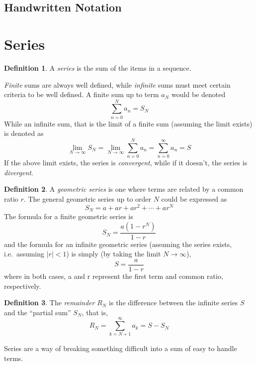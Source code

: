 \documentclass[10pt]{scrartcl}
\numberwithin{equation}{subsection}
\theoremstyle{definition}
\newtheorem{definition}{Definition}[section]
\theoremstyle{remark}
\newenvironment{definitionSR}
	{
		\begin{siderules}
			\begin{definition}
			}
			{
			\end{definition}
		\end{siderules}
	}
\begin{document}
\begin{itemize}
\end{itemize}
\subsection{Handwritten Notation}

\section{Series}
\begin{definitionSR}
	A \textit{series} is the sum of the items in a sequence.
\end{definitionSR}


\emph{Finite} sums are always well defined, while \emph{infinite} sums must meet certain criteria to be well defined. A finite sum up to term $a_N$ would be denoted
\[
	\sum_{n=0}^N a_n = S_N
\]
While an infinite sum, that is the limit of a finite sum (assuming the limit exists) is denoted as
\[
	\lim_{N \to \infty} S_N = \lim_{N \to \infty} \sum_{n=0}^N a_n = \sum_{n=0}^\infty a_n = S
\]
If the above limit exists, the series is \textit{convergent}, while if it doesn't, the series is \textit{divergent}.

\begin{definitionSR}
	A \textit{geometric series} is one where terms are related by a common ratio $r$. The general geometric series up to order $N$ could be expressed as
	\[
		S_N = a + ar + ar^2 + \cdots + ar^N
	\]
	The formula for a finite geometric series is
	\begin{equation}
		S_N = \frac{a(1-r^N)}{1-r}
	\end{equation}
	and the formula for an infinite geometric series (assuming the series exists, i.e.\ assuming $|r|<1$) is simply (by taking the limit $N \to \infty$),
	\begin{equation}
		S = \frac{a}{1-r}
	\end{equation}
	where in both cases, a and r represent the first term and common ratio, respectively.\\
\end{definitionSR}


\begin{definitionSR}
	The \textit{remainder} $R_N$ is the difference between the infinite series $S$ and the ``partial sum'' $S_N$, that is,
	\[
		R_N = \sum_{k=N+1}^\infty a_k = S-S_N
	\]
\end{definitionSR}

Series are a way of breaking something difficult into a sum of easy to handle
terms.
\end{document}
